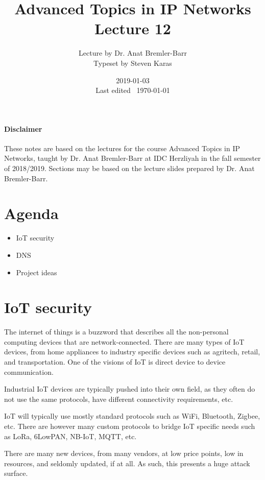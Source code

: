 \documentclass{idc_msc}
\title{Advanced Topics in IP Networks \\\large Lecture 12}
\date{2019-01-03 \\ Last edited \currenttime\ \today}
\author{Lecture by Dr. Anat Bremler-Barr\\Typeset by Steven Karas}
\begin{document}
\maketitle

\paragraph{Disclaimer}

These notes are based on the lectures for the course Advanced Topics in IP Networks, taught by Dr. Anat Bremler-Barr at IDC Herzliyah in the fall semester of 2018/2019.
Sections may be based on the lecture slides prepared by Dr. Anat Bremler-Barr.

\nocite{Varghese:2004:NAI:1203994}
\nocite{Crovella:2006:IMI:1196480}
\nocite{Kurose:2002:CNT:549735}

\section{Agenda}

\begin{itemize}
  \item IoT security
  \item DNS
  \item Project ideas
\end{itemize}

\section{IoT security}

The internet of things is a buzzword that describes all the non-personal computing devices that are network-connected.
There are many types of IoT devices, from home appliances to industry specific devices such as agritech, retail, and transportation.
One of the visions of IoT is direct device to device communication.

Industrial IoT devices are typically pushed into their own field, as they often do not use the same protocols, have different connectivity requirements, etc.

IoT will typically use mostly standard protocols such as WiFi, Bluetooth, Zigbee, etc.
There are however many custom protocols to bridge IoT specific needs such as LoRa, 6LowPAN, NB-IoT, MQTT, etc.

There are many new devices, from many vendors, at low price points, low in resources, and seldomly updated, if at all.
As such, this presents a huge attack surface.
\end{document}
